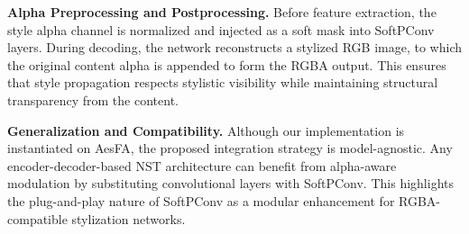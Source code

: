 \documentclass[letterpaper]{article} %
\begin{document}
\noindent\textbf{Alpha Preprocessing and Postprocessing.}
Before feature extraction, the style alpha channel is normalized and injected as a soft mask into SoftPConv layers. During decoding, the network reconstructs a stylized RGB image, to which the original content alpha is appended to form the RGBA output. This ensures that style propagation respects stylistic visibility while maintaining structural transparency from the content.

\noindent\textbf{Generalization and Compatibility.}
Although our implementation is instantiated on AesFA, the proposed integration strategy is model-agnostic. Any encoder-decoder-based NST architecture can benefit from alpha-aware modulation by substituting convolutional layers with SoftPConv. This highlights the plug-and-play nature of SoftPConv as a modular enhancement for RGBA-compatible stylization networks.








\end{document}
